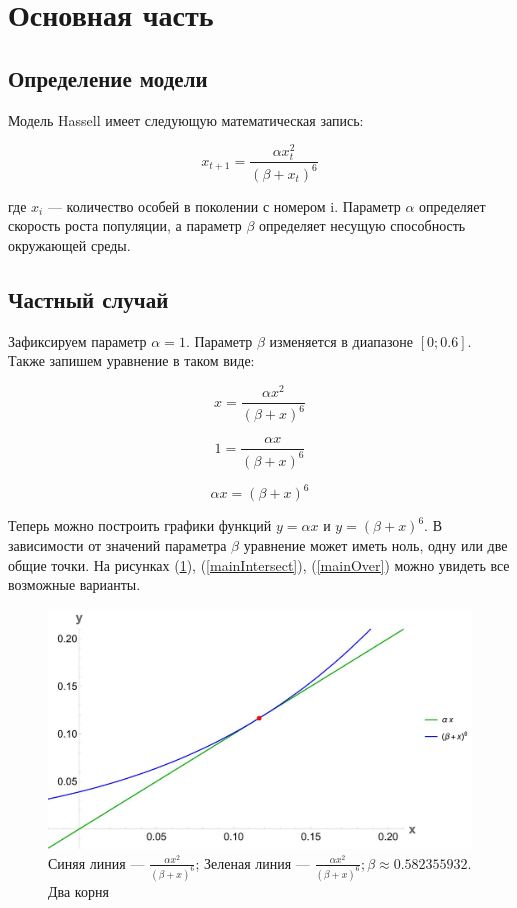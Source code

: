 
\section{Основная часть}

    \subsection{Определение модели}

        Модель Hassell имеет следующую математическая запись:

        \[x_{t+1} = \frac{\alpha x_t^2}{(\beta + x_t)^6}\]

        где \(x_i\) --- количество особей в поколении с номером i. Параметр \(\alpha\) определяет скорость роста популяции, а параметр \(\beta\) определяет несущую способность окружающей среды.
    
    \subsection{Частный случай}
    
        Зафиксируем параметр \(\alpha = 1\). Параметр \(\beta\) изменяется в диапазоне \([0; 0.6]\). Также запишем уравнение в таком виде:

        \[x = \frac{\alpha x^2}{(\beta + x)^6}\]
    
        \[1 = \frac{\alpha x}{(\beta + x)^6}\]

        \[\alpha x = (\beta + x)^6\]

        Теперь можно построить графики функций \(y = \alpha x\) и \(y = (\beta + x)^6\). В зависимости от значений параметра \(\beta\) уравнение может иметь ноль, одну или две общие точки. На рисунках (\ref{mainTouch}), (\ref{mainIntersect}), (\ref{mainOver}) можно увидеть все возможные варианты.

        \begin{figure}
            \centering
            \includegraphics[width=\textwidth]{images/main_touch.jpg}

            \captionsetup{justification=centering}
            \caption{Синяя линия --- \(\frac{\alpha x^2}{(\beta + x)^6}\); Зеленая линия --- \(\frac{\alpha x^2}{(\beta + x)^6}; \beta \approx 0.582355932\). Два корня}
            \label{mainTouch}
        \end{figure}
        
